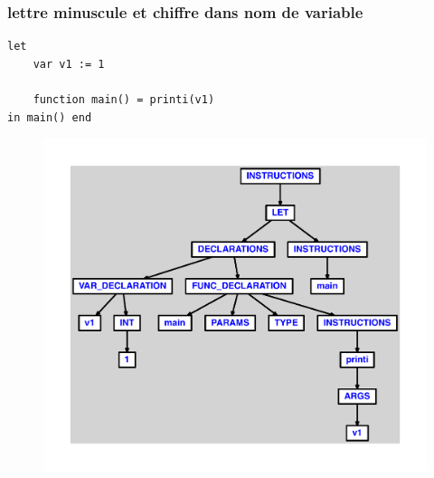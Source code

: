 \documentclass{article}
\begin{document}
\subsubsection{lettre minuscule et chiffre dans nom de variable}
\begin{lstlisting}
let
	var v1 := 1

	function main() = printi(v1)
in main() end
\end{lstlisting}
\newpage
\begin{figure}[H]
\centering
\includegraphics[max width=\textwidth]{ast/ast_317.pdf}
\end{figure}
\newpage
\end{document}
